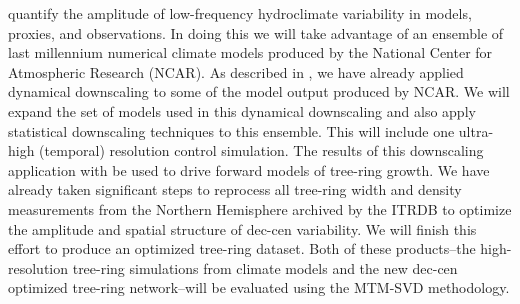 \documentclass[phd,tocprelim]{cornell}
\begin{document}
quantify the amplitude of low-frequency hydroclimate 
variability in models, proxies, and observations. In doing this
we will take advantage of an ensemble of last millennium 
numerical climate models produced by the National Center 
for Atmospheric Research (NCAR). As described in , 
we have already applied dynamical downscaling to some of the model 
output produced by NCAR. We will expand the set of models used in 
this dynamical downscaling and also apply statistical downscaling 
techniques to this ensemble. This will include one ultra-high 
(temporal) resolution control simulation. The results of this 
downscaling application with be used to drive forward models of 
tree-ring growth. We have already taken significant steps 
to reprocess all tree-ring width and density measurements from 
the Northern Hemisphere archived by the ITRDB to optimize the 
amplitude and spatial structure of dec-cen variability. We will 
finish this effort to produce an optimized tree-ring dataset. 
Both of these products--the high-resolution tree-ring simulations 
from climate models and the new dec-cen optimized tree-ring 
network--will be evaluated using the MTM-SVD methodology.
\par
\end{document}

